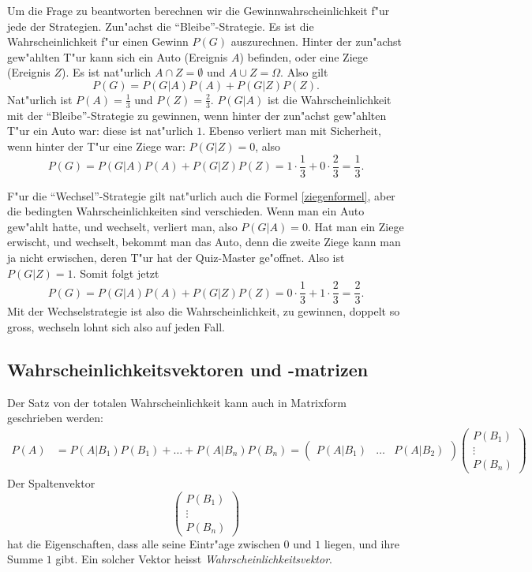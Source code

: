 Um die Frage zu beantworten berechnen wir die Gewinnwahrscheinlichkeit
f"ur jede der Strategien.
Zun"achst die ``Bleibe''-Strategie.
Es ist die
Wahrscheinlichkeit f"ur einen Gewinn $P(G)$ auszurechnen.
Hinter der zun"achst
gew"ahlten T"ur kann sich ein Auto (Ereignis $A$) befinden, oder eine Ziege
(Ereignis $Z$).
Es ist nat"urlich $A\cap Z=\emptyset$ und $A\cup Z=\Omega$.
Also gilt
\begin{equation}
P(G)=P(G|A) P(A) + P(G|Z)P(Z).
\label{ziegenformel}
\end{equation}
Nat"urlich ist $P(A)=\frac13$ und $P(Z)=\frac23$.
$P(G|A)$ ist die Wahrscheinlichkeit mit der ``Bleibe''-Strategie zu
gewinnen, wenn hinter der zun"achst gew"ahlten T"ur ein Auto war: diese
ist nat"urlich $1$.
Ebenso verliert man mit Sicherheit, wenn hinter der
T"ur eine Ziege war: $P(G|Z)=0$, also
\[
P(G)=P(G|A)P(A)+P(G|Z)P(Z)=1\cdot \frac13 + 0\cdot\frac 23=\frac13.
\]

F"ur die ``Wechsel''-Strategie gilt nat"urlich auch die Formel
\ref{ziegenformel}, aber die bedingten Wahrscheinlichkeiten sind verschieden.
Wenn man ein Auto gew"ahlt hatte, und wechselt, verliert man, also $P(G|A)=0$.
Hat man ein Ziege erwischt, und wechselt, bekommt man das Auto, denn die
zweite Ziege kann man ja nicht erwischen, deren T"ur hat der Quiz-Master
ge"offnet.
Also ist $P(G|Z)=1$.
Somit folgt jetzt
\[
P(G)=P(G|A)P(A)+P(G|Z)P(Z)=0\cdot\frac13+1\cdot\frac23=\frac23.
\]
Mit der Wechselstrategie ist also die Wahrscheinlichkeit, zu gewinnen,
doppelt so gross, wechseln lohnt sich also auf jeden Fall.


\subsection{Wahrscheinlichkeitsvektoren und -matrizen}
Der Satz von der totalen Wahrscheinlichkeit kann auch in Matrixform
geschrieben werden:
\begin{align*}
P(A)&=P(A|B_1)P(B_1)+\dots+P(A|B_n)P(B_n)
=
\begin{pmatrix}
P(A|B_1)&\dots&P(A|B_2)
\end{pmatrix}
\begin{pmatrix}
P(B_1)\\\vdots\\P(B_n)
\end{pmatrix}
\end{align*}
Der Spaltenvektor
\[
\begin{pmatrix}
P(B_1)\\\vdots\\P(B_n)
\end{pmatrix}
\]
hat die Eigenschaften, dass alle seine Eintr"age zwischen $0$ und $1$
liegen, und ihre Summe $1$ gibt.
Ein solcher Vektor heisst {\it Wahrscheinlichkeitsvektor}.

